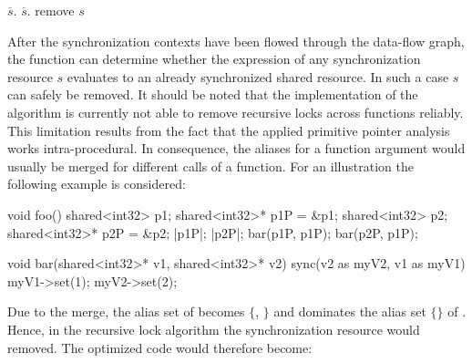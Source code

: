 \begin{algorithmic}
\State {}
 
      \State $\overline{s}.$ 
    \EndIf
  \EndFor
\EndFor
\Repeat {}
     
      \State $\overline{s}.$
    \EndIf
  \EndFor
{}
 
      \State remove $s$
  \EndIf
\EndFor
\EndFunction
\end{algorithmic}
After the synchronization contexts have been flowed through the data-flow graph, the function can determine whether the expression of any synchronization resource $s$ evaluates to an already synchronized shared resource. In such a case $s$ can safely be removed. It should be noted that the implementation of the algorithm is currently not able to remove recursive locks across functions reliably. This limitation results from the fact that the applied primitive pointer analysis works intra-procedural. In consequence, the aliases for a function argument would usually be merged for different calls of a function. For an illustration the following example is considered:
\begin{ccode}
void foo() {
  shared<int32> p1; 
  shared<int32>* p1P = &p1; 
  shared<int32> p2; 
  shared<int32>* p2P = &p2;
  |p1P|; 
  |p2P|;
  bar(p1P, p1P);
  bar(p2P, p1P);
}

void bar(shared<int32>* v1, shared<int32>* v2) { 
  sync(v2 as myV2, v1 as myV1) { 
    myV1->set(1); 
    myV2->set(2); 
  } 
}
\end{ccode}
Due to the merge, the alias set of  becomes $\{$, $\}$ and dominates the alias set $\{$$\}$ of . Hence, in the recursive lock algorithm the synchronization resource  would removed. The optimized code would therefore become:

